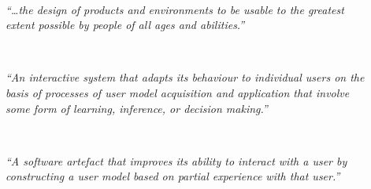 \begin{description}
  \item[] \hfill \\
  \begin{mdframed}[hidealllines=true,backgroundcolor=gray!20]
  \textit{``\dots the design of products and environments to be usable to the
  greatest extent possible by people of all ages and abilities.''} 
  \end{mdframed}

  \item[] \hfill \\
  \begin{mdframed}[hidealllines=true,backgroundcolor=gray!20]
  \textit{``An interactive system that adapts its behaviour to individual users
  on the basis of processes of user model acquisition and application that
  involve some form of learning, inference, or decision making.''} 
  \end{mdframed}

  \item[] \hfill \\
  \begin{mdframed}[hidealllines=true,backgroundcolor=gray!20]
  \textit{``A software artefact that improves its ability to interact with a user
  by constructing a user model based on partial experience with that user.''} 
  \end{mdframed}

\end{description}
  
\newpage

